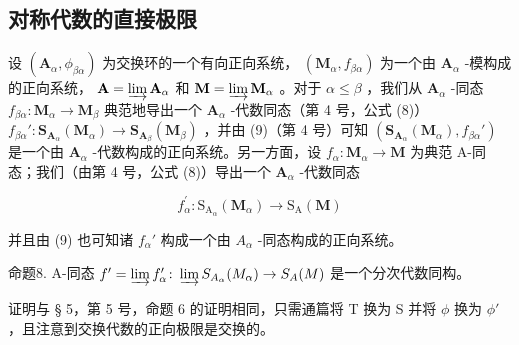 \subsection{对称代数的直接极限}

设 \((\mathbf{A}_{\alpha},\phi_{\beta \alpha})\) 为交换环的一个有向正向系统， \((\mathbf{M}_{\alpha},f_{\beta \alpha})\) 为一个由 \(\mathbf{A}_{\alpha}\) -模构成的正向系统， \(\mathbf{A} = \varinjlim \mathbf{A}_{\alpha}\) 和 \(\mathbf{M} = \varinjlim \mathbf{M}_{\alpha}\) 。对于 \(\alpha \leqslant \beta\) ，我们从 \(\mathbf{A}_{\alpha}\) -同态 \(f_{\beta \alpha}: \mathbf{M}_{\alpha} \to \mathbf{M}_{\beta}\) 典范地导出一个 \(\mathbf{A}_{\alpha}\) -代数同态（第 4 号，公式 (8)） \(f_{\beta \alpha}': \mathbf{S}_{\mathbf{A}_{\alpha}}(\mathbf{M}_{\alpha}) \to \mathbf{S}_{\mathbf{A}_{\beta}}(\mathbf{M}_{\beta})\) ，并由 (9)（第 4 号）可知 \((\mathbf{S}_{\mathbf{A}_{\alpha}}(\mathbf{M}_{\alpha}), f_{\beta \alpha}')\) 是一个由 \(\mathbf{A}_{\alpha}\) -代数构成的正向系统。另一方面，设 \(f_{\alpha}: \mathbf{M}_{\alpha} \to \mathbf{M}\) 为典范 A-同态；我们（由第 4 号，公式 (8)）导出一个 \(\mathbf{A}_{\alpha}\) -代数同态

\[
f _ {\alpha} ^ {\prime}: \mathrm{S} _ {\mathrm{A} _ {\alpha}} (\mathbf {M} _ {\alpha}) \rightarrow \mathrm{S} _ {\mathrm{A}} (\mathbf {M})
\]

并且由 (9) 也可知诸 \(f_{\alpha}'\) 构成一个由 \(A_{\alpha}\) -同态构成的正向系统。

命题8. A-同态 \(f' = \varinjlim f_{\alpha}' \colon \varinjlim S_{A_{\alpha}}(M_{\alpha}) \to S_{A}(M)\) 是一个分次代数同构。

证明与 § 5，第 5 号，命题 6 的证明相同，只需通篇将 T 换为 S 并将 \(\phi\) 换为 \(\phi'\) ，且注意到交换代数的正向极限是交换的。

